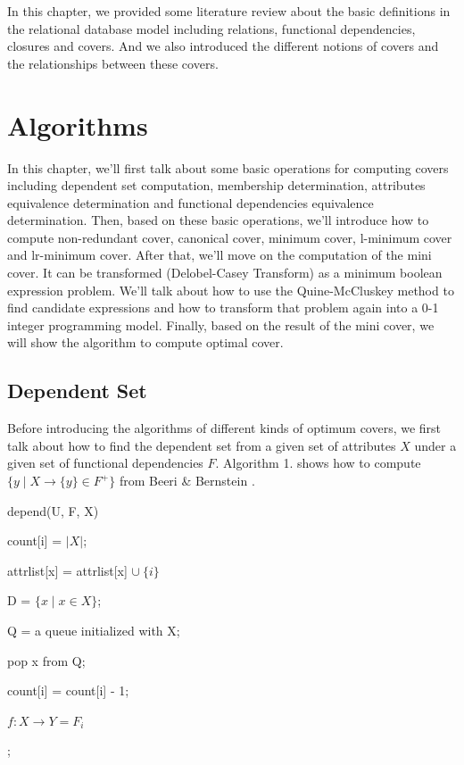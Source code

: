 \documentclass[11pt]{book}
\begin{document}
In this chapter, we provided some literature review about the basic definitions in the 
relational database model including relations, functional dependencies, closures and covers. And we also introduced the different notions of covers and the relationships between these covers. 

\chapter{Algorithms}

In this chapter, we'll first talk about some basic operations for computing covers including dependent set computation, membership determination, attributes equivalence determination and functional dependencies equivalence determination. Then, based on these basic operations, we'll introduce how to compute non-redundant cover, canonical cover, minimum cover, l-minimum cover and lr-minimum cover. After that, we'll move on the computation of the mini cover. It can be transformed (Delobel-Casey Transform) as a minimum boolean expression problem. We'll talk about how to use the Quine-McCluskey method to find candidate expressions and how to transform that problem again into a 0-1 integer programming model. Finally, based on the result of the mini cover, we will show the algorithm to compute optimal cover.

\section{Dependent Set}

Before introducing the algorithms of different kinds of optimum covers, we first talk about how to find the dependent set from a given set of attributes $X$ under a given set of functional dependencies $F$. Algorithm 1. shows how to compute $\{ y \mid X \rightarrow \{ y \} \in F^{+} \}$ from Beeri \& Bernstein \cite{beeri1979computational}.

\begin{algorithm}

  \caption{depend(U, F, X)}
 
  \SetAlgoLined
  
   {
    count[i] = $\lvert X \rvert$;
    
     {
    	attrlist[x] = attrlist[x] $\cup\ \{ i \}$
    }
  }
  
  D = $\{ x \mid x \in X \}$;
  
  Q = a queue initialized with X;
  
   {
  	pop x from Q;
  	
  	 {
  		count[i] = count[i] - 1;
  		
  		 {
  			$f: X \rightarrow Y = F_i$
  			
  		}
  	}
  }
  
  ;
\end{algorithm}
\end{document}
